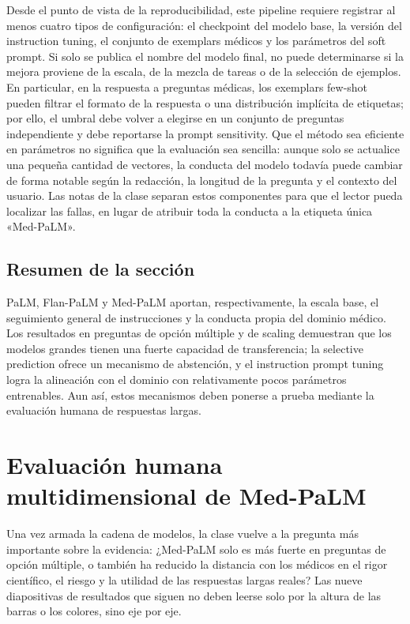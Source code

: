 \documentclass[a4paper]{article}
\begin{document}
Desde el punto de vista de la reproducibilidad, este pipeline requiere registrar al menos cuatro tipos de configuración: el checkpoint del modelo base, la versión del instruction tuning, el conjunto de exemplars médicos y los parámetros del soft prompt. Si solo se publica el nombre del modelo final, no puede determinarse si la mejora proviene de la escala, de la mezcla de tareas o de la selección de ejemplos. En particular, en la respuesta a preguntas médicas, los exemplars few-shot pueden filtrar el formato de la respuesta o una distribución implícita de etiquetas; por ello, el umbral debe volver a elegirse en un conjunto de preguntas independiente y debe reportarse la prompt sensitivity. Que el método sea eficiente en parámetros no significa que la evaluación sea sencilla: aunque solo se actualice una pequeña cantidad de vectores, la conducta del modelo todavía puede cambiar de forma notable según la redacción, la longitud de la pregunta y el contexto del usuario. Las notas de la clase separan estos componentes para que el lector pueda localizar las fallas, en lugar de atribuir toda la conducta a la etiqueta única «Med-PaLM».

\subsection{Resumen de la sección}

PaLM, Flan-PaLM y Med-PaLM aportan, respectivamente, la escala base, el seguimiento general de instrucciones y la conducta propia del dominio médico. Los resultados en preguntas de opción múltiple y de scaling demuestran que los modelos grandes tienen una fuerte capacidad de transferencia; la selective prediction ofrece un mecanismo de abstención, y el instruction prompt tuning logra la alineación con el dominio con relativamente pocos parámetros entrenables. Aun así, estos mecanismos deben ponerse a prueba mediante la evaluación humana de respuestas largas.
\section{Evaluación humana multidimensional de Med-PaLM}

Una vez armada la cadena de modelos, la clase vuelve a la pregunta más importante sobre la evidencia: ¿Med-PaLM solo es más fuerte en preguntas de opción múltiple, o también ha reducido la distancia con los médicos en el rigor científico, el riesgo y la utilidad de las respuestas largas reales? Las nueve diapositivas de resultados que siguen no deben leerse solo por la altura de las barras o los colores, sino eje por eje.
\end{document}
